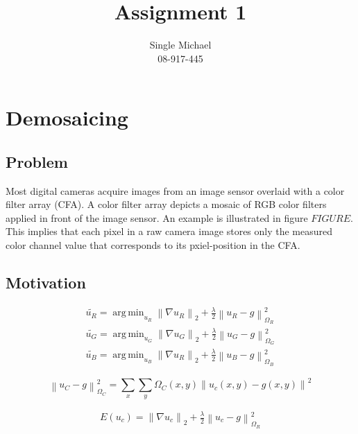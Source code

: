 \documentclass{paper}
\title{Assignment 1}
\author{Single Michael\\08-917-445}
\newcommand{\norm}[1]{\left\lVert#1\right\rVert}
\DeclareMathOperator*{\argmin}{arg\,min}
\begin{document}
\maketitle


%

\section{Demosaicing}
\subsection{Problem}
Most digital cameras acquire images from an image sensor overlaid with a color filter array (CFA). A color filter array depicts a mosaic of RGB color filters applied in front of the image sensor. An example is illustrated in figure $FIGURE$. This implies that each pixel in a raw camera image stores only the measured color channel value that corresponds to its pxiel-position in the CFA.


\subsection{Motivation}

\begin{align}
	\widetilde{u_R} = \argmin_{u_R} \norm{\nabla u_R}_2 + \frac{\lambda}{2} \norm{u_R - g}^2_{\Omega_{R}} \\
	\widetilde{u_G} = \argmin_{u_G} \norm{\nabla u_G}_2 + \frac{\lambda}{2} \norm{u_G - g}^2_{\Omega_{G}}\\
	\widetilde{u_B} = \argmin_{u_B} \norm{\nabla u_R}_2 + \frac{\lambda}{2} \norm{u_B - g}^2_{\Omega_{B}}		
\end{align}

\begin{equation}
	\norm{u_C - g}^2_{\Omega_{C}} = \sum_x \sum_y \Omega_{C}(x,y)\norm{u_{c}(x,y) - g(x,y)}^2
\end{equation}

\begin{align}
	E(u_{c}) =  \norm{\nabla u_c}_2 + \frac{\lambda}{2} \norm{u_c - g}^2_{\Omega_{R}}
\end{align}
\end{document}
